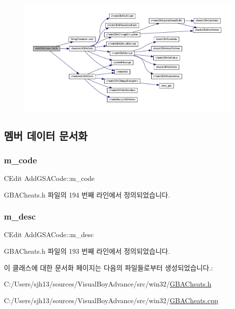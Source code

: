 \begin{figure}[H]
\begin{center}
\leavevmode
\includegraphics[width=350pt]{class_add_g_s_a_code_a857608ad314694d15ee6e811fb528d0b_cgraph}
\end{center}
\end{figure}


\subsection{멤버 데이터 문서화}
\mbox{\label{class_add_g_s_a_code_a0a4c3486121bd6be93e8f64215fea1ab}} 
\subsubsection{\texorpdfstring{m\+\_\+code}{m\_code}}
{\footnotesize\ttfamily C\+Edit Add\+G\+S\+A\+Code\+::m\+\_\+code}



G\+B\+A\+Cheats.\+h 파일의 194 번째 라인에서 정의되었습니다.

\mbox{\label{class_add_g_s_a_code_a766cb9061a235616a856d3c1b16879db}} 
\subsubsection{\texorpdfstring{m\+\_\+desc}{m\_desc}}
{\footnotesize\ttfamily C\+Edit Add\+G\+S\+A\+Code\+::m\+\_\+desc}



G\+B\+A\+Cheats.\+h 파일의 193 번째 라인에서 정의되었습니다.



이 클래스에 대한 문서화 페이지는 다음의 파일들로부터 생성되었습니다.\+:\begin{DoxyCompactItemize}
\item 
C\+:/\+Users/sjh13/sources/\+Visual\+Boy\+Advance/src/win32/\mbox{\hyperlink{_g_b_a_cheats_8h}{G\+B\+A\+Cheats.\+h}}\item 
C\+:/\+Users/sjh13/sources/\+Visual\+Boy\+Advance/src/win32/\mbox{\hyperlink{_g_b_a_cheats_8cpp}{G\+B\+A\+Cheats.\+cpp}}\end{DoxyCompactItemize}
